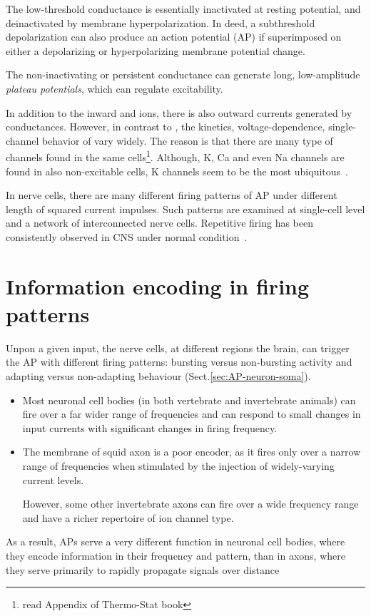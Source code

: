 The low-threshold  conductance is essentially inactivated at
resting potential, and deinactivated by membrane hyperpolarization. In
deed, a subthreshold depolarization can also produce an action
potential (AP) if superimposed on either a depolarizing or
hyperpolarizing membrane potential change. 

The non-inactivating or persistent  conductance can generate
long, low-amplitude {\it plateau potentials}, which can regulate
excitability.

In addition to the inward  and  ions, there is also
outward currents generated by  conductances. However, in
contrast to , the kinetics, voltage-dependence, single-channel
behavior of  vary widely. The reason is that there are many
type of  channels found in the same
cells\footnote{read Appendix of Thermo-Stat book}. Although, K, Ca and
  even Na channels are found in also non-excitable cells, K channels
  seem to be the most ubiquitous~\cite{rudy1988duk}.

  In nerve cells, there are many different firing patterns of AP under
  different length of squared current impulses. Such patterns are
  examined at single-cell level and a network of interconnected nerve
  cells.  Repetitive firing has been consistently observed in CNS
  under normal
  condition~\cite{kandel1961ehn_b, connor1971prf, connor1982epn}.

\section{Information encoding in firing patterns}
\label{sec:firing-pattern}

Unpon a given input, the nerve cells, at different regions the brain, can
trigger the AP with different firing patterns: bursting versus non-bursting
activity and adapting versus non-adapting behaviour
(Sect.\ref{sec:AP-neuron-soma}).
\begin{itemize}
  \item  Most neuronal cell bodies (in both vertebrate
and invertebrate animals) can fire over a far wider range
of frequencies and can respond to small changes in input
currents with significant changes in firing frequency.
  
  \item The membrane of squid axon is a poor encoder, as it fires
only over a narrow range of frequencies when stimulated
by the injection of widely-varying current levels.

However, some other invertebrate axons
can fire over a wide frequency range and have a richer
repertoire of ion channel type.
\end{itemize}
As a result, APs serve a very different function in neuronal
cell bodies, where they encode information in their
frequency and pattern, than in axons, where they serve
primarily to rapidly propagate signals over distance



